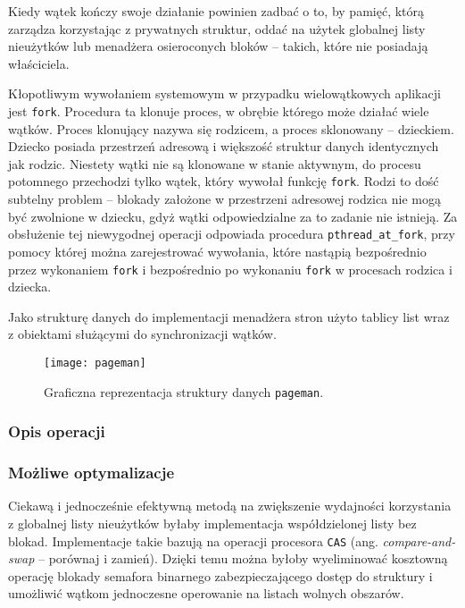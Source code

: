 \documentclass[12pt,a4paper,titlepage,twoside]{mwart}
\begin{document}
Kiedy wątek kończy swoje działanie powinien zadbać o to, by pamięć, którą
zarządza korzystając z prywatnych struktur, oddać na użytek globalnej listy
nieużytków lub menadżera osieroconych bloków -- takich, które nie posiadają
właściciela.

Kłopotliwym wywołaniem systemowym w przypadku wielowątkowych aplikacji jest
\texttt{fork}. Procedura ta klonuje proces, w obrębie którego może działać
wiele wątków. Proces klonujący nazywa się rodzicem, a proces sklonowany --
dzieckiem.  Dziecko posiada przestrzeń adresową i większość struktur danych
identycznych jak rodzic. Niestety wątki nie są klonowane w stanie aktywnym, do
procesu potomnego przechodzi tylko wątek, który wywołał funkcję \verb+fork+.
Rodzi to dość subtelny problem -- blokady założone w przestrzeni adresowej
rodzica nie mogą być zwolnione w dziecku, gdyż wątki odpowiedzialne za to
zadanie nie istnieją. Za obsłużenie tej niewygodnej operacji odpowiada
procedura \verb+pthread_at_fork+, przy pomocy której można zarejestrować
wywołania, które nastąpią bezpośrednio przez wykonaniem \verb+fork+ i
bezpośrednio po wykonaniu \verb+fork+ w procesach rodzica i dziecka.

Jako strukturę danych do implementacji menadżera stron użyto tablicy list wraz
z obiektami służącymi do synchronizacji wątków.

\begin{figure}[h]
\centering
\texttt{[image: pageman]}
\caption{Graficzna reprezentacja struktury danych \texttt{pageman}.}
\end{figure}

\subsubsection{Opis operacji}

\subsubsection{Możliwe optymalizacje}

Ciekawą i jednocześnie efektywną metodą na zwiększenie wydajności korzystania z
globalnej listy nieużytków byłaby implementacja współdzielonej listy bez
blokad. Implementacje takie bazują na operacji procesora \verb+CAS+ (ang.
\textit{compare-and-swap} -- porównaj i zamień). Dzięki temu można byłoby
wyeliminować kosztowną operację blokady semafora binarnego zabezpieczającego
dostęp do struktury i umożliwić wątkom jednoczesne operowanie na listach
wolnych obszarów.
\end{document}
